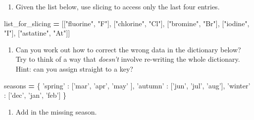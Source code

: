 \documentclass[]{book}
\newenvironment{Shaded}{\begin{snugshade}}{\end{snugshade}}
\newcommand{\NormalTok}[1]{#1}
\newcommand{\OperatorTok}[1]{\textcolor[rgb]{0.81,0.36,0.00}{\textbf{#1}}}
\newcommand{\StringTok}[1]{\textcolor[rgb]{0.31,0.60,0.02}{#1}}
\providecommand{\tightlist}{%
  \setlength{\itemsep}{0pt}\setlength{\parskip}{0pt}}
\theoremstyle{definition}
\theoremstyle{definition}
\theoremstyle{definition}
\theoremstyle{remark}
\begin{document}
\begin{enumerate}
\def\labelenumi{\arabic{enumi}.}
\tightlist
\item
  Given the list below, use slicing to access only the last four
  entries.
\end{enumerate}

\begin{Shaded}
\begin{Highlighting}[]
\NormalTok{list_for_slicing }\OperatorTok{=}\NormalTok{ [[}\StringTok{"fluorine"}\NormalTok{, }\StringTok{"F"}\NormalTok{], }
\NormalTok{                    [}\StringTok{"chlorine"}\NormalTok{, }\StringTok{"Cl"}\NormalTok{], }
\NormalTok{                    [}\StringTok{"bromine"}\NormalTok{, }\StringTok{"Br"}\NormalTok{], }
\NormalTok{                    [}\StringTok{"iodine"}\NormalTok{, }\StringTok{"I"}\NormalTok{], }
\NormalTok{                    [}\StringTok{"astatine"}\NormalTok{, }\StringTok{"At"}\NormalTok{]]}
\end{Highlighting}
\end{Shaded}

\begin{enumerate}
\def\labelenumi{\arabic{enumi}.}
\setcounter{enumi}{1}
\tightlist
\item
  Can you work out how to correct the wrong data in the dictionary
  below? Try to think of a way that \emph{doesn't} involve re-writing
  the whole dictionary. Hint: can you assign straight to a key?
\end{enumerate}

\begin{Shaded}
\begin{Highlighting}[]
\NormalTok{seasons }\OperatorTok{=}\NormalTok{ \{}
  \StringTok{'spring'}\NormalTok{ : [}\StringTok{'mar'}\NormalTok{, }\StringTok{'apr'}\NormalTok{, }\StringTok{'may'}\NormalTok{ ],}
  \StringTok{'autumn'}\NormalTok{ : [}\StringTok{'jun'}\NormalTok{, }\StringTok{'jul'}\NormalTok{, }\StringTok{'aug'}\NormalTok{],}
  \StringTok{'winter'}\NormalTok{ : [}\StringTok{'dec'}\NormalTok{, }\StringTok{'jan'}\NormalTok{, }\StringTok{'feb'}\NormalTok{]}
\NormalTok{\}}
\end{Highlighting}
\end{Shaded}

\begin{enumerate}
\def\labelenumi{\arabic{enumi}.}
\setcounter{enumi}{2}
\tightlist
\item
  Add in the missing season.
\end{enumerate}
\end{document}
